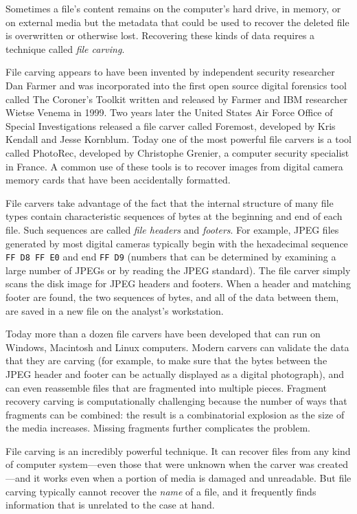 Sometimes a file's content remains on the computer's hard
drive, in memory, or on external media but the metadata that could be
used to recover the deleted file is overwritten or otherwise lost. Recovering
these kinds of data requires a technique called \emph{file carving}.

File carving appears to have been invented by independent security researcher
Dan Farmer and was incorporated into the first open source digital
forensics tool called The Coroner's Toolkit written and released by Farmer and IBM
researcher Wietse Venema in 1999. Two years later 
the United
States Air Force Office of Special Investigations released a file carver called Foremost, developed by Kris Kendall and
Jesse Kornblum. Today one of the most powerful file carvers is 
a tool called PhotoRec, developed by Christophe Grenier, a computer
security specialist in France. A common use
of these tools is to recover images from digital camera memory cards
that have been accidentally formatted.

File carvers take advantage of the fact that the internal structure of
many file types contain
characteristic sequences of bytes at the beginning and
end  of each file. Such sequences are called \emph{file headers} and
\emph{footers}. For example, JPEG files generated by
most digital cameras typically begin with the hexadecimal sequence \texttt{FF D8 FF E0} and end
\texttt{FF D9}  (numbers that can be determined by examining a large
number of JPEGs or by reading the JPEG standard). The file carver simply scans the disk image for JPEG
headers and footers. When a header and matching footer are found, the
two sequences of bytes, and all of the data between them, are saved in
a new file on the analyst's workstation.

Today more than a dozen file carvers have been developed that can
run on Windows, Macintosh and Linux computers. Modern carvers can
validate the data that they are carving (for example, to make sure
that the bytes between the JPEG header and footer can be actually
displayed as a digital photograph), and can even reassemble files that are fragmented
into multiple pieces\citep{pal-sht}. Fragment recovery carving is
computationally challenging because the number of ways that fragments
can be combined: the result is a combinatorial explosion as the size of
the media increases. Missing fragments further complicates the problem.

File carving is an incredibly powerful technique. It can recover files
from any kind of computer system---even those that were unknown when
the carver was created---and it works even when a portion of media is
damaged and unreadable. But file carving typically cannot recover the
\emph{name} of a file, and it frequently finds information that is
unrelated to the case at hand.


